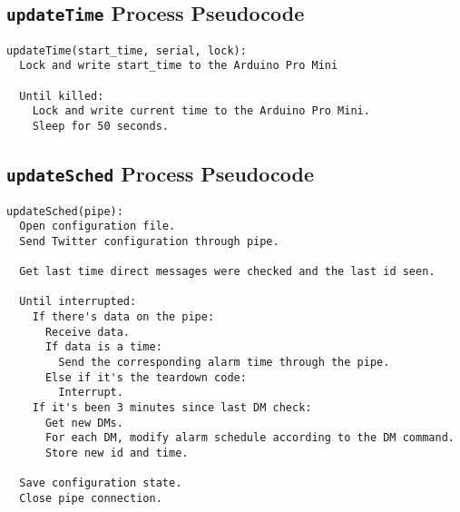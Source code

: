 \subsection{\texttt{updateTime} Process Pseudocode}
\begin{verbatim}
updateTime(start_time, serial, lock):
  Lock and write start_time to the Arduino Pro Mini

  Until killed:
    Lock and write current time to the Arduino Pro Mini.
    Sleep for 50 seconds.
\end{verbatim}

\subsection{\texttt{updateSched} Process Pseudocode}
\begin{verbatim}
updateSched(pipe):
  Open configuration file.
  Send Twitter configuration through pipe.

  Get last time direct messages were checked and the last id seen.

  Until interrupted:
    If there's data on the pipe:
      Receive data.
      If data is a time:
        Send the corresponding alarm time through the pipe.
      Else if it's the teardown code:
        Interrupt.
    If it's been 3 minutes since last DM check:
      Get new DMs.
      For each DM, modify alarm schedule according to the DM command.
      Store new id and time.

  Save configuration state.
  Close pipe connection.
\end{verbatim}
